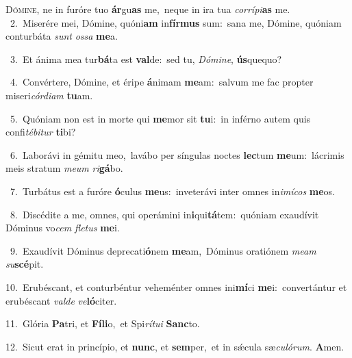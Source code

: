 \lettrine{\initial\textcolor{\initialcolor}{D}}{ómine,} ne in furóre tuo \textbf{ár}\-gu\textbf{as} me,~\star neque in ira tua \textit{cor}\-\textit{rí}\textit{pi}\textbf{as} me.\\
{\numbfont\textcolor{\numbcolor}{~2.}}~Miserére mei, Dómine, quóni\textbf{am} in\-\textbf{fír}\-\textbf{mus} sum:~\star sana me, Dómine, quóniam conturbáta \textit{sunt} \textit{os}\-\textit{sa} \textbf{me}\-a.\par
{\numbfont\textcolor{\numbcolor}{~3.}}~Et ánima mea tur\-\textbf{bá}\-ta est \textbf{val}\-de:~\star sed tu, \textit{Dó}\-\textit{mi}\textit{ne}, \textbf{ús}\-quequo?\par
{\numbfont\textcolor{\numbcolor}{~4.}}~Convértere, Dómine, et éripe \textbf{á}\-nimam \textbf{me}\-am:~\star salvum me fac propter miseri\-\textit{cór}\-\textit{di}\textit{am} \textbf{tu}\-am.\par
{\numbfont\textcolor{\numbcolor}{~5.}}~Quóniam non est in morte qui \textbf{me}\-mor sit \textbf{tu}\-i:~\star in inférno autem quis confi\-\textit{té}\-\textit{bi}\textit{tur} \textbf{ti}\-bi?\par
{\numbfont\textcolor{\numbcolor}{~6.}}~Laborávi in gémitu meo,~\dagger lavábo per síngulas noctes \textbf{lec}\-tum \textbf{me}\-um:~\star lácrimis meis stratum \textit{me}\-\textit{um} \textit{ri}\-\textbf{gá}bo.\par
{\numbfont\textcolor{\numbcolor}{~7.}}~Turbátus est a furóre \textbf{ó}\-culus \textbf{me}\-us:~\star inveterávi inter omnes in\-\textit{i}\-\textit{mí}\textit{cos} \textbf{me}\-os.\par
{\numbfont\textcolor{\numbcolor}{~8.}}~Discédite a me, omnes, qui operámini in\-\textbf{i}\-qui\-\textbf{tá}\-tem:~\star quóniam exaudívit Dóminus vo\textit{cem} \textit{fle}\-\textit{tus} \textbf{me}\-i.\par
{\numbfont\textcolor{\numbcolor}{~9.}}~Exaudívit Dóminus deprecati\-\textbf{ó}\-nem \textbf{me}\-am,~\star Dóminus oratiónem \textit{me}\-\textit{am} \textit{su}\-\textbf{scé}pit.\par
{\numbfont\textcolor{\numbcolor}{10.}}~Erubéscant, et conturbéntur veheménter omnes ini\-\textbf{mí}\-ci \textbf{me}\-i:~\star convertántur et erubéscant \textit{val}\-\textit{de} \textit{ve}\-\textbf{ló}citer.\par
{\numbfont\textcolor{\numbcolor}{11.}}~Glória \textbf{Pa}\-tri, et \textbf{Fí}\-\textbf{li}o,~\star et Spi\-\textit{rí}\-\textit{tu}\textit{i} \textbf{Sanc}\-to.\par
{\numbfont\textcolor{\numbcolor}{12.}}~Sicut erat in princípio, et \textbf{nunc}\-, et \textbf{sem}\-per,~\star et in sǽcula sæ\-\textit{cu}\-\textit{ló}\textit{rum}. \textbf{A}\-men.\par
